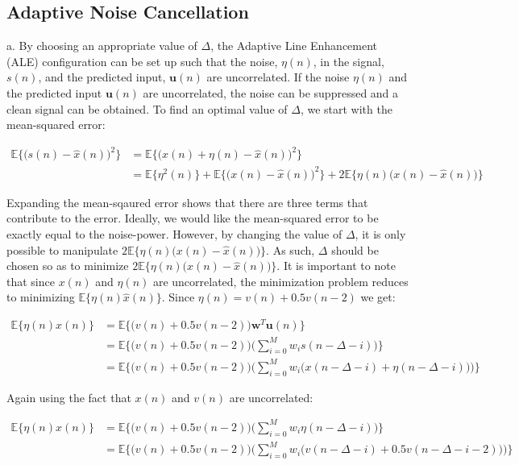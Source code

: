 \subsection{Adaptive Noise Cancellation}

\noindent{}a. By choosing an appropriate value of $\Delta$, the Adaptive Line Enhancement (ALE) configuration can be set up such that the noise, $\eta(n)$, in the signal, $s(n)$, and the predicted input, $\textbf{u}(n)$ are uncorrelated. If the noise $\eta(n)$ and the predicted input $\textbf{u}(n)$ are uncorrelated, the noise can be suppressed and a clean signal can be obtained. To find an optimal value of $\Delta$, we start with the mean-squared error:

\begin{align*}
\mathbb{E}\bigg\{\bigg(s(n)-\hat{x}(n)\bigg)^2\bigg\} &= \mathbb{E}\bigg\{\bigg(x(n)+\eta(n)-\hat{x}(n)\bigg)^2\bigg\} \\
&=\mathbb{E}\{\eta^2(n)\} + \mathbb{E}\bigg\{\bigg(x(n)-\hat{x}(n)\bigg)^2\bigg\} + 2\mathbb{E}\bigg\{\eta(n)\bigg(x(n)-\hat{x}(n)\bigg)\bigg\}
\end{align*}

\noindent{}Expanding the mean-sqaured error shows that there are three terms that contribute to the error. Ideally, we would like the mean-squared error to be exactly equal to the noise-power. However, by changing the value of $\Delta$, it is only possible to manipulate $2\mathbb{E}\bigg\{\eta(n)\bigg(x(n)-\hat{x}(n)\bigg)\bigg\}$. As such, $\Delta$ should be chosen so as to minimize $2\mathbb{E}\bigg\{\eta(n)\bigg(x(n)-\hat{x}(n)\bigg)\bigg\}$. It is important to note that since $x(n)$ and $\eta(n)$ are uncorrelated, the minimization problem reduces to minimizing $\mathbb{E}\{\eta(n)\hat{x}(n)\}$. Since $\eta(n)=v(n) + 0.5v(n-2)$ we get:

\begin{align*}
\mathbb{E}\{\eta(n)\hat{x}(n)\} &= \mathbb{E}\bigg\{\bigg( v(n) + 0.5v(n-2)\bigg) \textbf{w}^T \textbf{u}(n)\bigg\} \\
&= \mathbb{E}\bigg\{\bigg( v(n) + 0.5v(n-2)\bigg) \bigg(\sum_{i=0}^{M}w_{i}s(n-\Delta-i)\bigg)\bigg\} \\
&= \mathbb{E}\bigg\{\bigg( v(n) + 0.5v(n-2)\bigg) \bigg(\sum_{i=0}^{M}w_{i}\big(x(n-\Delta-i)+\eta(n-\Delta-i)\big)\bigg)\bigg\} 
\end{align*}

\noindent{}Again using the fact that $x(n)$ and $v(n)$ are uncorrelated:

\begin{align*}
\mathbb{E}\{\eta(n)\hat{x}(n)\} &= \mathbb{E}\bigg\{\bigg( v(n) + 0.5v(n-2)\bigg) \bigg(\sum_{i=0}^{M}w_{i}\eta(n-\Delta-i)\bigg)\bigg\} \\
&= \mathbb{E}\bigg\{\bigg( v(n) + 0.5v(n-2)\bigg) \bigg(\sum_{i=0}^{M}w_{i}\big(v(n-\Delta-i)+0.5v(n-\Delta-i-2)\big)\bigg)\bigg\}
\end{align*}

